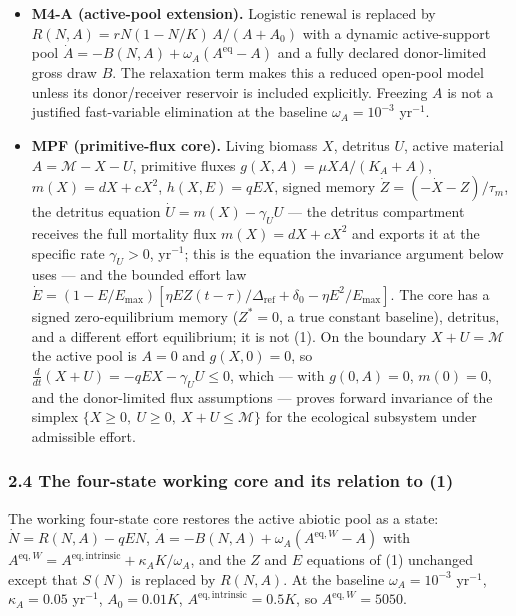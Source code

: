 \documentclass[11pt]{article}
\begin{document}
\begin{itemize}
\item
  \textbf{M4-A (active-pool extension).} Logistic renewal is replaced by
  \(R(N,A) = rN(1 - N/K)\, A/(A + A_0)\) with a dynamic active-support
  pool \(\dot A = -B(N,A) + \omega_A(A^{\mathrm{eq}} - A)\) and a fully
  declared donor-limited gross draw \(B\). The relaxation term makes
  this a reduced open-pool model unless its donor/receiver reservoir is
  included explicitly. Freezing \(A\) is not a justified fast-variable
  elimination at the baseline \(\omega_A = 10^{-3}\) yr\(^{-1}\).
\item
  \textbf{MPF (primitive-flux core).} Living biomass \(X\), detritus
  \(U\), active material \(A = \mathcal{M} - X - U\), primitive fluxes
  \(g(X,A) = \mu XA/(K_A + A)\), \(m(X) = dX + cX^2\), \(h(X,E) = qEX\),
  signed memory \(\dot Z = (-\dot X - Z)/\tau_m\), the detritus equation
  \(\dot U = m(X) - \gamma_U U\) --- the detritus compartment receives
  the full mortality flux \(m(X) = dX + cX^2\) and exports it at the
  specific rate \(\gamma_U > 0\), yr\(^{-1}\); this is the equation the
  invariance argument below uses --- and the bounded effort law
  \(\dot E = (1 - E/E_{\max})[\eta E Z(t-\tau)/\Delta_{\mathrm{ref}} + \delta_0 - \eta E^2/E_{\max}]\).
  The core has a signed zero-equilibrium memory (\(Z^* = 0\), a true
  constant baseline), detritus, and a different effort equilibrium; it
  is not (1). On the boundary \(X + U = \mathcal{M}\) the active pool is
  \(A = 0\) and \(g(X,0) = 0\), so
  \(\frac{d}{dt}(X+U) = -qEX - \gamma_U U \le 0\), which --- with
  \(g(0,A) = 0\), \(m(0) = 0\), and the donor-limited flux assumptions
  --- proves forward invariance of the simplex
  \(\{X \ge 0,\ U \ge 0,\ X + U \le \mathcal{M}\}\) for the ecological
  subsystem under admissible effort.
\end{itemize}

\subsubsection{2.4 The four-state working core and its relation to
(1)}\label{the-four-state-working-core-and-its-relation-to-1}

The working four-state core restores the active abiotic pool as a state:
\(\dot N = R(N,A) - qEN\),
\(\dot A = -B(N,A) + \omega_A(A^{\mathrm{eq},W} - A)\) with
\(A^{\mathrm{eq},W} = A^{\mathrm{eq,intrinsic}} + \kappa_A K/\omega_A\),
and the \(Z\) and \(E\) equations of (1) unchanged except that \(S(N)\)
is replaced by \(R(N,A)\). At the baseline \(\omega_A = 10^{-3}\)
yr\(^{-1}\), \(\kappa_A = 0.05\) yr\(^{-1}\), \(A_0 = 0.01K\),
\(A^{\mathrm{eq,intrinsic}} = 0.5K\), so \(A^{\mathrm{eq},W} = 5050\).
\end{document}
